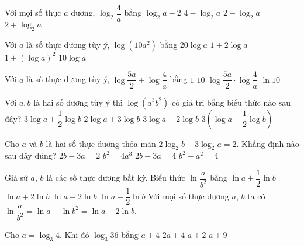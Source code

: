 \begin{ex}
	Với mọi số thực $a$ dương, $\log_2 {\dfrac{4}{a}} $ bằng
	\choice
	{$ \log_2 a - 2 $}
	{$4-\log_2 a$}	
	{\True $2-\log_2 a$}
	{$2+\log_2 a$}
\end{ex}

\begin{ex}
	Với $a$ là số thực dương tùy ý, $\log\left(10a^2\right)$ bằng
	\choice
	{$20\log a$}
	{\True $1+2\log a$}
	{$1+\left(\log a\right)^2$}
	{$10\log a$}
\end{ex}
\begin{ex}
	Với $a$ là số thực dương tùy ý, $\log \dfrac{5 a}{2}+\log \dfrac{4}{a}$ bằng
	\choice
	{\True $1 $}
	{$ 10 $}
	{$\log \dfrac{5 a}{2} \cdot \log \dfrac{4}{a}$}
	{$\ln 10$}
\end{ex}

\begin{ex}
	Với $a, b$ là hai số dương tùy ý thì $\log \left(a^3 b^2\right)$ có giá trị bằng biểu thức nào sau đây?
	\choice
	{$3 \log a+\dfrac{1}{2} \log b $}
	{$2 \log a+3 \log b $}
	{\True $3 \log a+2 \log b $}
	{$3\left(\log a+\dfrac{1}{2} \log b\right) $}
\end{ex}
\begin{ex}
	Cho $a$ và $b$ là hai số thực dương thỏa mãn $2\log_2b-3\log_2a=2$. Khẳng định nào sau đây đúng?
	\choice
	{$2b-3a=2$}
	{\True $b^2=4a^3$}
	{$2b-3a=4$}
	{$b^2-a^2=4$}
\end{ex}
\begin{ex}
	Giả sử $a$, $b$ là các số thực dương bất kỳ. Biểu thức $\ln \dfrac{a}{b^2}$ bằng
	\choice
	{$\ln a+\dfrac{1}{2}\ln b$}
	{$\ln a+2\ln b$}
	{\True $\ln a-2\ln b$}
	{$\ln a-\dfrac{1}{2}\ln b$}
	\loigiai
	{
		Với mọi số thực dương $a$, $b$ ta có $\ln \dfrac{a}{b^2}=\ln a-\ln b^2 = \ln a-2\ln b$.
	}
\end{ex}
\begin{ex}
	Cho $a=\log_3 4$. Khi đó $\log_3 36$ bằng
	\choice
	{$a+4$}
	{$2a+4$}
	{\True $a+2$}
	{$a+9$}
\end{ex}

